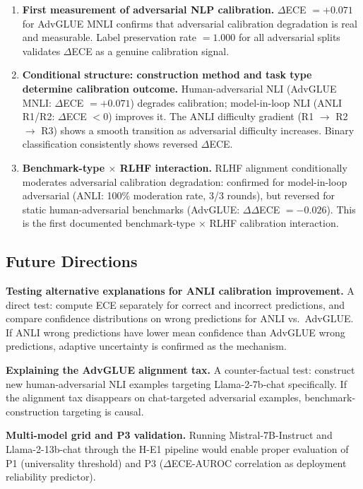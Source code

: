 \begin{enumerate}
  \item \textbf{First measurement of adversarial NLP calibration.} $\Delta$ECE $= +0.071$ for AdvGLUE MNLI confirms that adversarial calibration degradation is real and measurable. Label preservation rate $= 1.000$ for all adversarial splits validates $\Delta$ECE as a genuine calibration signal.
  \item \textbf{Conditional structure: construction method and task type determine calibration outcome.} Human-adversarial NLI (AdvGLUE MNLI: $\Delta$ECE $= +0.071$) degrades calibration; model-in-loop NLI (ANLI R1/R2: $\Delta$ECE $< 0$) improves it. The ANLI difficulty gradient (R1 $\rightarrow$ R2 $\rightarrow$ R3) shows a smooth transition as adversarial difficulty increases. Binary classification consistently shows reversed $\Delta$ECE.
  \item \textbf{Benchmark-type $\times$ RLHF interaction.} RLHF alignment conditionally moderates adversarial calibration degradation: confirmed for model-in-loop adversarial (ANLI: 100\% moderation rate, 3/3 rounds), but reversed for static human-adversarial benchmarks (AdvGLUE: $\Delta\Delta$ECE $= -0.026$). This is the first documented benchmark-type $\times$ RLHF calibration interaction.
\end{enumerate}

\subsection*{Future Directions}

\textbf{Testing alternative explanations for ANLI calibration improvement.} A direct test: compute ECE separately for correct and incorrect predictions, and compare confidence distributions on wrong predictions for ANLI vs.\ AdvGLUE. If ANLI wrong predictions have lower mean confidence than AdvGLUE wrong predictions, adaptive uncertainty is confirmed as the mechanism.

\textbf{Explaining the AdvGLUE alignment tax.} A counter-factual test: construct new human-adversarial NLI examples targeting Llama-2-7b-chat specifically. If the alignment tax disappears on chat-targeted adversarial examples, benchmark-construction targeting is causal.

\textbf{Multi-model grid and P3 validation.} Running Mistral-7B-Instruct and Llama-2-13b-chat through the H-E1 pipeline would enable proper evaluation of P1 (universality threshold) and P3 ($\Delta$ECE-AUROC correlation as deployment reliability predictor).

